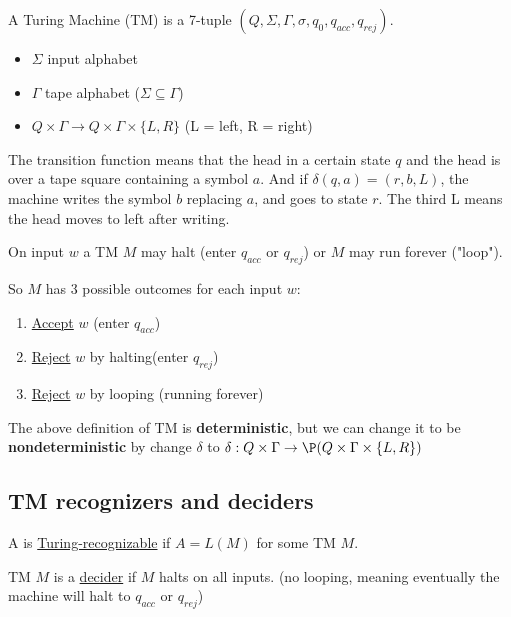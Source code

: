 \begin{definition}
   A Turing Machine (TM) is a 7-tuple \((Q, \Sigma, \Gamma, \sigma, q_0, q_{acc}, q_{rej})\). 

   \begin{itemize}
    \item \(\Sigma\) input alphabet
    \item \(\Gamma\) tape alphabet (\(\Sigma \subseteq \Gamma\))
    \item \(Q \times \Gamma \rightarrow Q \times \Gamma \times \{ L, R \} \) \quad (L = left, R = right)  
   \end{itemize}

   The transition function means that the head in a certain state \(q\) and the head is over a tape square containing a symbol \(a\). 
   And if \(\delta(q, a) = (r, b, L)\), the machine writes the symbol \(b\) replacing \(a\), and goes to state \(r\). The third L means the head moves to left after writing.    
\end{definition}

On input \(w\) a TM \(M\) may halt (enter \(q_{acc}\) or \(q_{rej}\)) or \(M\) may run forever ("loop"). 

So \(M\) has 3 possible outcomes for each input \(w\):
\begin{enumerate}
    \item \underline{Accept} \(w\) (enter \(q_{acc}\)) 
    \item \underline{Reject} \(w\) by halting(enter \(q_{rej}\)) 
    \item \underline{Reject} \(w\) by looping (running forever) 
\end{enumerate}  

The above definition of TM is \textbf{deterministic}, but we can change it to be \textbf{nondeterministic} by change \(\delta\) to \(\delta: Q \times \Gamma \rightarrow \P(Q \times \Gamma \times \{ L, R \}) \)  

\subsection{TM recognizers and deciders}

\begin{definition}
    A is \underline{Turing-recognizable} if \(A = L(M)\) for some TM \(M\).  
\end{definition}

\begin{definition}
    TM \(M\) is a \underline{decider} if \(M\) halts on all inputs. (no looping, meaning eventually the machine will halt to \(q_{acc}\) or \(q_{rej}\))  
\end{definition}

